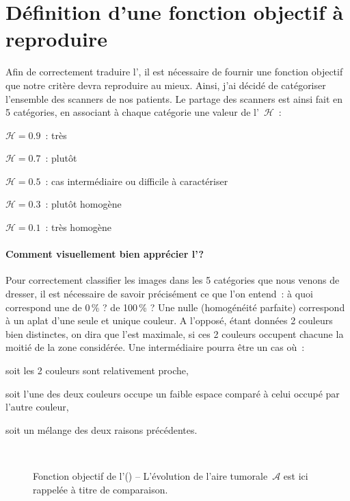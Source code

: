 \documentclass[main.tex]{subfiles}
\begin{document}
\section{Définition d'une fonction objectif à reproduire}
Afin de correctement traduire l'\hetero, il est nécessaire de fournir une fonction objectif que notre critère devra reproduire au mieux. Ainsi, j'ai décidé de catégoriser l'ensemble des scanners de nos patients. Le partage des scanners est ainsi fait en 5 catégories, en associant à chaque catégorie une valeur de l'\hetero~$\mathscr{H}$~:
\begin{myitemize}
\item $\mathscr{H}=0.9$~: très \heterogene
\item $\mathscr{H}=0.7$~: plutôt \heterogene
\item $\mathscr{H}=0.5$~: cas intermédiaire ou difficile à caractériser
\item $\mathscr{H}=0.3$~: plutôt homogène
\item $\mathscr{H}=0.1$~: très homogène
\end{myitemize}

\paragraph{Comment visuellement bien apprécier l'\hetero ?}
Pour correctement classifier les images dans les 5 catégories que nous venons de dresser, il est nécessaire de savoir précisément ce que l'on entend~: à quoi correspond une \hetero de 0\,\% ? de 100\,\% ? Une \hetero nulle (\ie homogénéité parfaite) correspond à un aplat d'une seule et unique couleur. A l'opposé, étant données 2 couleurs bien distinctes, on dira que l'\hetero est maximale, si  ces 2 couleurs occupent chacune la moitié de la zone considérée. Une \hetero intermédiaire pourra être un cas où~:
\begin{myitemize}
\item soit les 2 couleurs sont relativement proche,
\item soit l'une des deux couleurs occupe un faible espace comparé à celui occupé par l'autre couleur, 
\item soit un mélange des deux raisons précédentes.
\end{myitemize}~
\begin{figure}
\caption{\label{fig:hetero_visuelle}Fonction objectif de l'\hetero (\!\!\HHobj) -- L'évolution de l'aire tumorale~$\mathcal{A}$ est ici rappelée à titre de comparaison.}
\end{figure}
\end{document}
